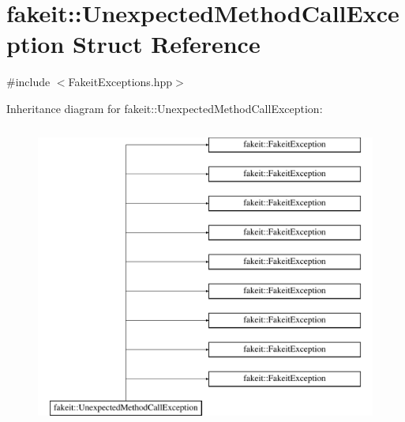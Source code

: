 \hypertarget{structfakeit_1_1UnexpectedMethodCallException}{}\section{fakeit\+::Unexpected\+Method\+Call\+Exception Struct Reference}
\label{structfakeit_1_1UnexpectedMethodCallException}


{\ttfamily \#include $<$Fakeit\+Exceptions.\+hpp$>$}

Inheritance diagram for fakeit\+::Unexpected\+Method\+Call\+Exception\+:\begin{figure}[H]
\begin{center}
\leavevmode
\includegraphics[height=10.000000cm]{structfakeit_1_1UnexpectedMethodCallException}
\end{center}
\end{figure}
